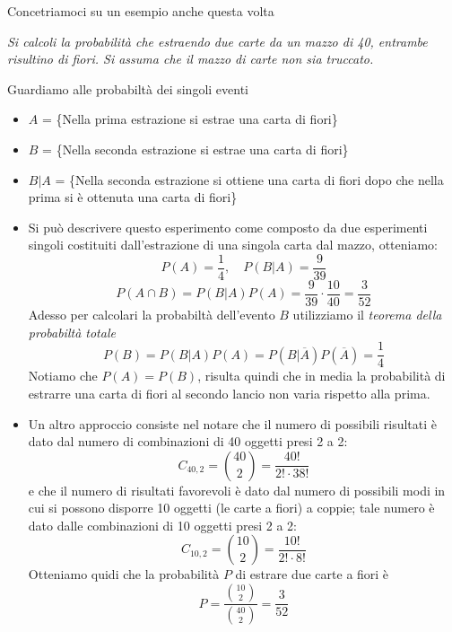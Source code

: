 Concetriamoci su un esempio anche questa volta
\begin{importantbox}
    \textit{Si calcoli la probabilità che estraendo due carte da un mazzo di 40, entrambe
    risultino di fiori. Si assuma che il mazzo di carte non sia truccato.}
\end{importantbox}
Guardiamo alle probabiltà dei singoli eventi 
\begin{itemize}
    \item $A$ = \{Nella prima estrazione si estrae una carta di fiori\}
    \item $B$ = \{Nella seconda estrazione si estrae una carta di fiori\}
    \item $B|A$ = \{Nella seconda estrazione si ottiene una carta di fiori dopo che nella prima
si è ottenuta una carta di fiori\}
\end{itemize}
\begin{itemize}
    \item  Si può descrivere questo esperimento come composto da due
esperimenti singoli costituiti dall’estrazione di una singola carta dal mazzo, otteniamo: 
    \[
        P(A) = \frac{1}{4}, \quad P(B|A) = \frac{9}{39}
    \]
    \[
        P(A \cap B) = P(B|A)P(A) =\frac{9}{39}\cdot\frac{10}{40} = \frac{3}{52}
    \]
    Adesso per calcolari la probabiltà dell'evento $B$ utilizziamo il \textit{teorema della probabiltà totale}
    \[
        P(B) = P(B|A)P(A) = P(B|\overline A)P(\overline A) = \frac{1}{4}
    \]
    Notiamo che $P(A) = P(B)$, risulta quindi che in media la probabilità di estrarre 
    una carta di fiori al secondo lancio non varia rispetto alla prima.
\item Un altro approccio consiste nel notare che il  numero di possibili risultati è dato dal numero di combinazioni di 40
oggetti presi 2 a 2:
\[
    C_{40,2} = \binom{40}{2} = \frac{40!}{2!\cdot38!}
\]
e che il numero di risultati favorevoli è dato dal numero di possibili modi in
cui si possono disporre 10 oggetti (le carte a fiori) a coppie; tale
numero è dato dalle combinazioni di 10 oggetti presi 2 a 2:
\[
    C_{10, 2} = \binom{10}{2} = \frac{10!}{2!\cdot8!}
\]
Otteniamo quidi che la probabilità $P$ di estrare due carte a fiori è
\[
    P = \frac{\binom{10}{2}}{\binom{40}{2}} = \frac{3}{52}
\]
\end{itemize}

